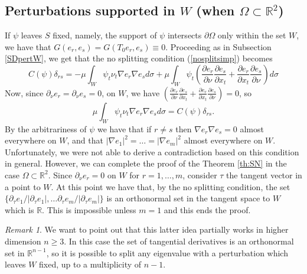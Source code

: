 \documentclass[a4paper,reqno,11pt,oneside]{amsart}
\theoremstyle{plain}
\theoremstyle{plain}
\theoremstyle{plain}
\theoremstyle{remark}
\newtheorem{remark}[thm]{Remark}
\begin{document}
\subsection{Perturbations supported in $W$ (when $\Omega \subset \mathbb{R}^2$)}
If $\psi$ leaves $S$ fixed, namely,  the support of $\psi$ intersects $\partial \Omega$ only within the set $W$, we have that $G( e_r,e_s)=G(T_0 e_r,e_s)\equiv 0$. Proceeding as in Subsection \ref{SDpertW}, we get that the no splitting condition (\ref{nosplitsimp}) becomes
\begin{equation}\label{eq:nospiltDir}
 C(\psi)\delta_{rs}=-\mu\int_{W}\psi_t \nu_t \nabla e_r\nabla e_s
 d\sigma
+\mu\int_{W}
\psi_t\left(\frac{\partial e_r}{\partial \nu}\frac{\partial e_s}{\partial x_t}+\frac{\partial e_r}{\partial x_t}\frac{\partial e_s}{\partial \nu}
\right) d\sigma 
\end{equation}
Now, since $\partial_\nu e_r=\partial_\nu e_s=0$, on $W$, we have $\left(\frac{\partial e_r}{\partial \nu}\frac{\partial e_s}{\partial x_t}+\frac{\partial e_r}{\partial x_t}\frac{\partial e_s}{\partial \nu}
\right)=0$, so
\begin{equation*}
    \mu\int_{W}\psi_t \nu_t \nabla e_r\nabla e_sd\sigma
=C(\psi)\delta_{rs}.
\end{equation*}
By the arbitrariness of  $\psi$ we have that if $r\neq s $ then $\nabla e_r\nabla e_s=0$ almost everywhere on $W$, and that $|\nabla e_1|^2=\dots=|\nabla e_m|^2$ almost everywhere on $W$. Unfortunately, we were not able to derive a contradiction based on this condition in general. However,  we can complete the proof of the Theorem \ref{th:SN} in the case $\Omega\subset \mathbb{R}^2$. 
Since $\partial_\nu e_r=0$ on $W$ for $r=1,\dots,m$,  consider $\tau$ the tangent vector in a point to $W$.  At this point we have that, by the no splitting condition, the set $\{\partial_\tau e_1/|\partial_\tau e_1|, \dots \partial_\tau e_m/|\partial_\tau e_m| \}$ is an orthonormal set in the tangent space to $W$ which is  $\mathbb{R}$.  This is impossible unless $m=1$ and this ends the proof.

\begin{remark}\label{rem-n3}
    We want to point out that this latter idea partially works in higher dimension $n\ge 3$. In this case the set of tangential derivatives is an orthonormal set in $\mathbb{R}^{n-1}$, so it is possible to split any eigenvalue with a perturbation which leaves $W$ fixed, up to a multiplicity of $n-1$. 
\end{remark}
\end{document}
